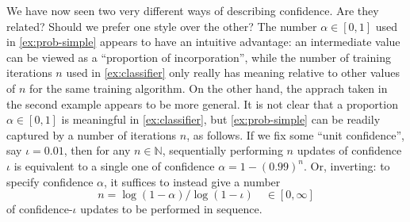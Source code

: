 We have now seen two very different ways of describing confidence. 
Are they related? Should we prefer one style over the other?
The number $\alpha \in [0,1]$ used in \cref{ex:prob-simple}
appears to have an intuitive advantage: an intermediate value can be 
viewed as a ``proportion of incorporation'', while the number of
training iterations $n$ used in \cref{ex:classifier} only really
has meaning relative to other values of $n$ for the same training algorithm.
On the other hand,
the apprach taken in the second example
appears to be more general. 
It is not clear that a proportion $\alpha \in [0,1]$ 
is meaningful in \cref{ex:classifier},
but \cref{ex:prob-simple} can be
readily captured by a number of iterations 
$n$, as follows.
% 
%
%
If we fix some ``unit confidence'', say $\iota=0.01$,
then for any $n \in \mathbb N$,
sequentially performing $n$ updates of confidence $\iota$ is 
equivalent to a single one of confidence $\alpha= 1-(0.99)^n$.
Or, inverting:
to specify confidence $\alpha$, it suffices to 
instead give a number
\begin{equation} \label{eq:loglogiota}
 	n = \log (1 - \alpha ) / \log(1-\iota) 
	\quad\in[0,\infty]
\end{equation}
of confidence-$\iota$ updates to be performed in sequence.


